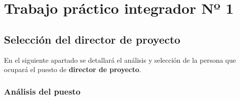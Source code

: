 \section{Trabajo práctico integrador Nº 1}
\subsection{Selección del director de proyecto}
En el siguiente apartado se detallará el análisis y selección de la persona que ocupará el puesto de \textbf{director de proyecto}.

\subsubsection{Análisis del puesto}

